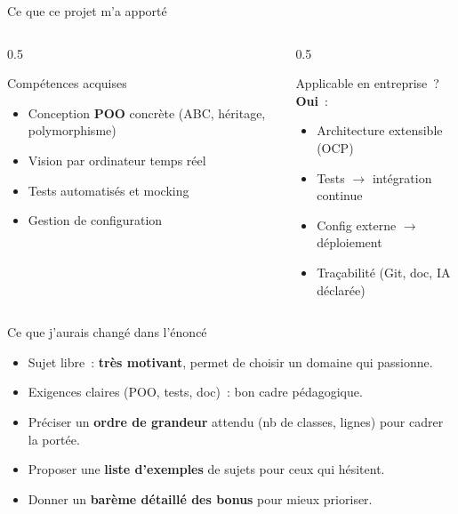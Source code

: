 \documentclass[aspectratio=169,12pt]{beamer}
\begin{document}
\begin{frame}{Ce que ce projet m'a apport\'e}
  \begin{columns}
    \begin{column}{0.5\textwidth}
      \begin{block}{Comp\'etences acquises}
        \begin{itemize}
          \item Conception \textbf{POO} concr\`ete (ABC, h\'eritage, polymorphisme)
          \item Vision par ordinateur temps r\'eel
          \item Tests automatis\'es et mocking
          \item Gestion de configuration
        \end{itemize}
      \end{block}
    \end{column}
    \begin{column}{0.5\textwidth}
      \begin{block}{Applicable en entreprise~?}
        \textbf{Oui}~:
        \begin{itemize}
          \item Architecture extensible (OCP)
          \item Tests $\rightarrow$ int\'egration continue
          \item Config externe $\rightarrow$ d\'eploiement
          \item Tra\c{c}abilit\'e (Git, doc, IA d\'eclar\'ee)
        \end{itemize}
      \end{block}
    \end{column}
  \end{columns}
\end{frame}

\begin{frame}{Ce que j'aurais chang\'e dans l'\'enonc\'e}
  \begin{itemize}
    \item[\textcolor{green!60!black}{$+$}] Sujet libre~: \textbf{tr\`es motivant}, permet de choisir un domaine qui passionne.
    \item[\textcolor{green!60!black}{$+$}] Exigences claires (POO, tests, doc)~: bon cadre p\'edagogique.
    \vspace{0.3cm}
    \item[\textcolor{accent}{$\sim$}] Pr\'eciser un \textbf{ordre de grandeur} attendu (nb de classes, lignes) pour cadrer la port\'ee.
    \item[\textcolor{accent}{$\sim$}] Proposer une \textbf{liste d'exemples} de sujets pour ceux qui h\'esitent.
    \item[\textcolor{accent}{$\sim$}] Donner un \textbf{barème d\'etaill\'e des bonus} pour mieux prioriser.
  \end{itemize}
\end{frame}
\end{document}
